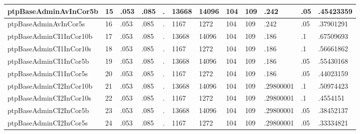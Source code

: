 \begin{tabular}{|l|l|l|l|l|l|l|l|l|l|l|l|}
ptpBaseAdminAvInCor5b & 15 & .053 & .085 & . & 13668 & 14096 & 104 & 109 & .242 & .05 & .45423359 \\ \hline 
ptpBaseAdminAvInCor5s & 16 & .053 & .085 & . & 1167 & 1272 & 104 & 109 & .242 & .05 & .37901291 \\ \hline 
ptpBaseAdminCI1InCor10b & 17 & .053 & .085 & . & 13668 & 14096 & 104 & 109 & .186 & .1 & .67509693 \\ \hline 
ptpBaseAdminCI1InCor10s & 18 & .053 & .085 & . & 1167 & 1272 & 104 & 109 & .186 & .1 & .56661862 \\ \hline 
ptpBaseAdminCI1InCor5b & 19 & .053 & .085 & . & 13668 & 14096 & 104 & 109 & .186 & .05 & .55430168 \\ \hline 
ptpBaseAdminCI1InCor5s & 20 & .053 & .085 & . & 1167 & 1272 & 104 & 109 & .186 & .05 & .44023159 \\ \hline 
ptpBaseAdminCI2InCor10b & 21 & .053 & .085 & . & 13668 & 14096 & 104 & 109 & .29800001 & .1 & .50974423 \\ \hline 
ptpBaseAdminCI2InCor10s & 22 & .053 & .085 & . & 1167 & 1272 & 104 & 109 & .29800001 & .1 & .4554151 \\ \hline 
ptpBaseAdminCI2InCor5b & 23 & .053 & .085 & . & 13668 & 14096 & 104 & 109 & .29800001 & .05 & .38452137 \\ \hline 
ptpBaseAdminCI2InCor5s & 24 & .053 & .085 & . & 1167 & 1272 & 104 & 109 & .29800001 & .05 & .33334821 \\ \hline 
  \end{tabular}

